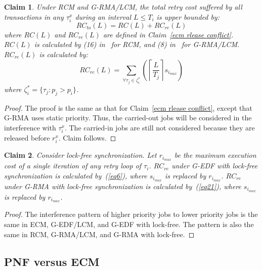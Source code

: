 \documentclass[a4paper,english]{article}
\newtheorem{clm}{Claim}
\newtheorem{proof}{Proof}
\begin{document}
\begin{clm}\label{rcm rlease conflict}
Under RCM and G-RMA/LCM, the total retry cost suffered by all transactions in any $\tau_i^x$ during an interval $L\le T_i$ is upper bounded by:
\begin{equation}
RC_{to}(L)=RC(L)+RC_{re}(L)
\label{total rc rcm eq}
\end{equation}
%
where $RC(L)$ and $RC_{re}(L)$ are defined in Claim~\ref{ecm rlease conflict}. $RC(L)$ is calculated by (16) in~\cite{stmconcurrencycontrol:emsoft11} for RCM, and (8) in~\cite{lcmdac2012} for G-RMA/LCM. $RC_{re}(L)$ is calculated by:
\begin{equation}
RC_{re}(L)=\sum_{\forall \tau_j \in \zeta_i^*}\left(\left\lceil\frac{L}{T_j}\right\rceil s_{i_{max}}\right)\label{eq21}
\end{equation}
%
where $\zeta_i^*=\{\tau_j:p_j > p_i \}$.
\end{clm}
\begin{proof}\normalfont
The proof is the same as that for Claim~\ref{ecm rlease conflict}, except that G-RMA uses static priority. Thus, the carried-out jobs will be considered in the  interference with $\tau_i^x$. The carried-in jobs are still not considered because they are released before $r_i^x$. Claim follows.
\end{proof}
\begin{clm}\label{lock free release}
Consider lock-free synchronization. Let $r_{i_{max}}$ be the maximum execution cost of a single iteration of any retry loop of $\tau_i$. $RC_{re}$ under G-EDF  with lock-free synchronization is calculated by~(\ref{eq6}), where $s_{i_{max}}$ is replaced by $r_{i_{max}}$. $RC_{re}$ under G-RMA with lock-free synchronization is calculated by~(\ref{eq21}), where $s_{i_{max}}$ is replaced by $r_{i_{max}}$.
\end{clm}
%
\begin{proof}\normalfont
The interference pattern of higher priority jobs to lower priority jobs is the same in ECM, G-EDF/LCM, and G-EDF with lock-free. The pattern is also the same in RCM, G-RMA/LCM, and G-RMA with lock-free. 
\end{proof}


\subsection{PNF versus ECM\label{pnf vs ecm sec}}
\end{document}
